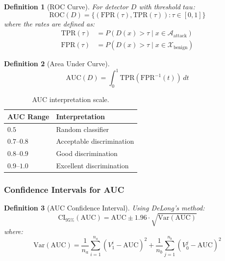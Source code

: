\documentclass[
]{article}
\newtheorem{definition}{Definition}[section]
\begin{document}
\begin{definition}[ROC Curve]
\label{def:roc-curve}
For detector $D$ with threshold $tau$:
\begin{equation}
\label{eq:roc-curve}
\text{ROC}(D) = \{(\text{FPR}(\tau), \text{TPR}(\tau)) : \tau \in [0, 1]\}
\end{equation}
where the rates are defined as:
\begin{align}
\label{eq:tpr}
\text{TPR}(\tau) &= P(D(x) > \tau \mid x \in \mathcal{A}_{\text{attack}}) \\
\label{eq:fpr}
\text{FPR}(\tau) &= P(D(x) > \tau \mid x \in \mathcal{X}_{\text{benign}})
\end{align}
\end{definition}

\begin{definition}[Area Under Curve]
\label{def:auc}
\begin{equation}
\label{eq:auc}
\text{AUC}(D) = \int_0^1 \text{TPR}(\text{FPR}^{-1}(t)) \, dt
\end{equation}
\end{definition}

\begin{table}[htbp]
\centering
\caption{AUC interpretation scale.}
\label{tab:auc-interpretation}
\begin{tabular}{@{}ll@{}}
\toprule
AUC Range & Interpretation \\
\midrule
$0.5$ & Random classifier \\
$0.7$--$0.8$ & Acceptable discrimination \\
$0.8$--$0.9$ & Good discrimination \\
$0.9$--$1.0$ & Excellent discrimination \\
\bottomrule
\end{tabular}
\end{table}

\subsubsection{Confidence Intervals for
AUC}\label{confidence-intervals-for-auc}

\begin{definition}[AUC Confidence Interval]
\label{def:auc-ci}
Using DeLong's method:
\begin{equation}
\label{eq:auc-ci}
\text{CI}_{95\%}(\text{AUC}) = \text{AUC} \pm 1.96 \cdot \sqrt{\text{Var}(\text{AUC})}
\end{equation}
where:
\begin{equation}
\label{eq:auc-variance}
\text{Var}(\text{AUC}) = \frac{1}{n_a} \sum_{i=1}^{n_a} (V_1^i - \text{AUC})^2 + \frac{1}{n_b} \sum_{j=1}^{n_b} (V_0^j - \text{AUC})^2
\end{equation}
\end{definition}
\end{document}
